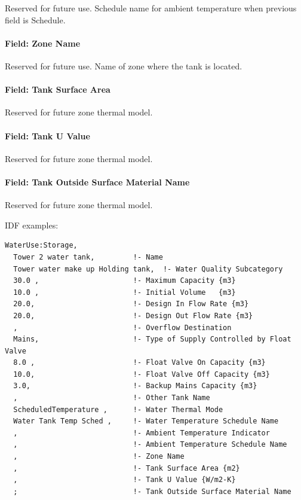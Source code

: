 Reserved for future use. Schedule name for ambient temperature when previous field is Schedule.

\paragraph{Field: Zone Name}\label{field-zone-name-1-010}

Reserved for future use. Name of zone where the tank is located.

\paragraph{Field: Tank Surface Area}\label{field-tank-surface-area}

Reserved for future zone thermal model.

\paragraph{Field: Tank U Value}\label{field-tank-u-value}

Reserved for future zone thermal model.

\paragraph{Field: Tank Outside Surface Material Name}\label{field-tank-outside-surface-material-name}

Reserved for future zone thermal model.

IDF examples:

\begin{lstlisting}
WaterUse:Storage,
  Tower 2 water tank,         !- Name
  Tower water make up Holding tank,  !- Water Quality Subcategory
  30.0 ,                      !- Maximum Capacity {m3}
  10.0 ,                      !- Initial Volume   {m3}
  20.0,                       !- Design In Flow Rate {m3}
  20.0,                       !- Design Out Flow Rate {m3}
  ,                           !- Overflow Destination
  Mains,                      !- Type of Supply Controlled by Float Valve
  8.0 ,                       !- Float Valve On Capacity {m3}
  10.0,                       !- Float Valve Off Capacity {m3}
  3.0,                        !- Backup Mains Capacity {m3}
  ,                           !- Other Tank Name
  ScheduledTemperature ,      !- Water Thermal Mode
  Water Tank Temp Sched ,     !- Water Temperature Schedule Name
  ,                           !- Ambient Temperature Indicator
  ,                           !- Ambient Temperature Schedule Name
  ,                           !- Zone Name
  ,                           !- Tank Surface Area {m2}
  ,                           !- Tank U Value {W/m2-K}
  ;                           !- Tank Outside Surface Material Name
\end{lstlisting}

